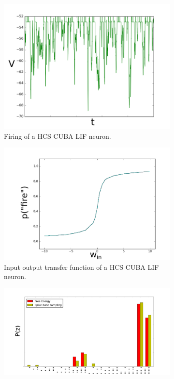 \begin{figure}
	\centering
	\begin{subfigure}[t]{.5\textwidth}
  		\centering
  		\includegraphics[width=.8\linewidth]{imgs/cuba_lif_act.png}
  		\caption{Firing of a HCS CUBA LIF neuron.}
  		\label{fig:sub1}
	\end{subfigure}%
	\begin{subfigure}[t]{.5\textwidth}
  		\centering
  		\includegraphics[width=.8\linewidth]{imgs/cuba_lif_sigmoid.png}
  		\caption{Input output transfer function of a HCS CUBA LIF neuron.}
  		\label{fig:sub2}
	\end{subfigure}
	\begin{subfigure}[t]{.5\textwidth}
  		\centering
  		\includegraphics[width=.8\linewidth]{imgs/cuba_lif_bm.png}

\end{subfigure}
\end{figure}
